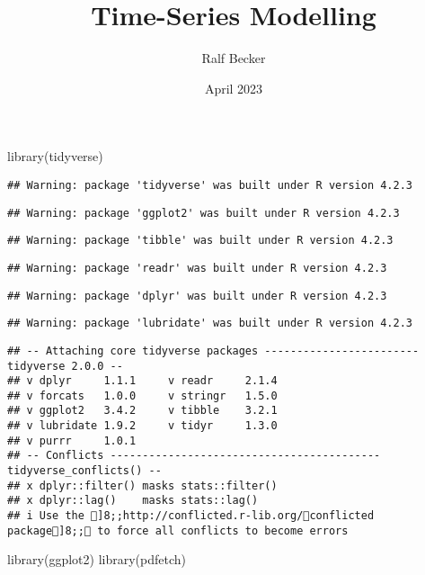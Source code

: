 \documentclass[
]{article}
\title{Time-Series Modelling}
\author{Ralf Becker}
\date{April 2023}
\newenvironment{Shaded}{\begin{snugshade}}{\end{snugshade}}
\newcommand{\FunctionTok}[1]{\textcolor[rgb]{0.00,0.00,0.00}{#1}}
\newcommand{\NormalTok}[1]{#1}
\begin{document}
\maketitle

\begin{Shaded}
\begin{Highlighting}[]
\FunctionTok{library}\NormalTok{(tidyverse)}
\end{Highlighting}
\end{Shaded}

\begin{verbatim}
## Warning: package 'tidyverse' was built under R version 4.2.3
\end{verbatim}

\begin{verbatim}
## Warning: package 'ggplot2' was built under R version 4.2.3
\end{verbatim}

\begin{verbatim}
## Warning: package 'tibble' was built under R version 4.2.3
\end{verbatim}

\begin{verbatim}
## Warning: package 'readr' was built under R version 4.2.3
\end{verbatim}

\begin{verbatim}
## Warning: package 'dplyr' was built under R version 4.2.3
\end{verbatim}

\begin{verbatim}
## Warning: package 'lubridate' was built under R version 4.2.3
\end{verbatim}

\begin{verbatim}
## -- Attaching core tidyverse packages ------------------------ tidyverse 2.0.0 --
## v dplyr     1.1.1     v readr     2.1.4
## v forcats   1.0.0     v stringr   1.5.0
## v ggplot2   3.4.2     v tibble    3.2.1
## v lubridate 1.9.2     v tidyr     1.3.0
## v purrr     1.0.1     
## -- Conflicts ------------------------------------------ tidyverse_conflicts() --
## x dplyr::filter() masks stats::filter()
## x dplyr::lag()    masks stats::lag()
## i Use the ]8;;http://conflicted.r-lib.org/conflicted package]8;; to force all conflicts to become errors
\end{verbatim}

\begin{Shaded}
\begin{Highlighting}[]
\FunctionTok{library}\NormalTok{(ggplot2)}
\FunctionTok{library}\NormalTok{(pdfetch)}
\end{Highlighting}
\end{Shaded}
\end{document}
